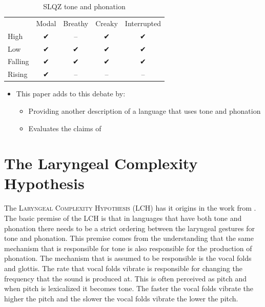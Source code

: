 \documentclass[12pt, letterpaper]{article}
\providecommand{\lsptoprule}{\midrule\toprule}
\providecommand{\lspbottomrule}{\bottomrule\midrule}
\begin{document}
\begin{table}[!ht]
	\centering
	\caption{SLQZ tone and phonation}
	\label{tab:SLQZ}
	\begin{tabular}{lcccc}
		\lsptoprule
						&	 Modal  & Breathy & Creaky & Interrupted \\
			High	& ✔︎ & -- & ✔︎ & ✔︎ \\
			Low & ✔︎ & ✔︎ & ✔︎ & ✔︎ \\
			Falling & ✔︎ & ✔︎ & ✔︎ & ✔︎ \\
			Rising & ✔︎ & -- & -- & -- \\
		\lspbottomrule
	\end{tabular}
\end{table}
\begin{itemize}
	\item This paper adds to this debate by:
	\begin{itemize}
		\item Providing another description of a language that uses tone and phonation
		\item Evaluates the claims of \citet{silvermanLaryngealComplexityOtomanguean1997}
	\end{itemize}
\end{itemize}

\section{The Laryngeal Complexity Hypothesis} \label{sec:Silverman}

The \textsc{Laryngeal Complexity Hypothesis} (LCH) has it origins in the work from \citet{silvermanLaryngealComplexityOtomanguean1997,blankenshipTimeCourseBreathiness1997,blankenshipTimingNonmodalPhonation2002}. The basic premise of the LCH is that in languages that have both tone and phonation there needs to be a strict ordering between the laryngeal gestures for tone and phonation. This premise comes from the understanding that the same mechanism that is responsible for tone is also responsible for the production of phonation. The mechanism that is assumed to be responsible is the vocal folds and glottis. The rate that vocal folds vibrate is responsible for changing the frequency that the sound is produced at. This is often perceived as pitch and when pitch is lexicalized it becomes tone. The faster the vocal folds vibrate the higher the pitch and the slower the vocal folds vibrate the lower the pitch. 
\end{document}
